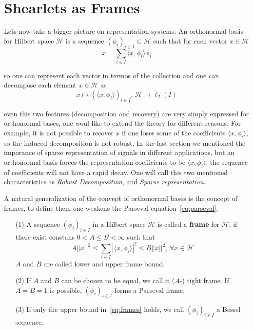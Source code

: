 \section{Shearlets as Frames}
\label{sec:ShearletsFrames}

Lets now take a bigger picture on representation systems. An orthonormal basis for Hilbert space $\mathcal{H}$ is a sequence $(\phi_i)_{i\in I}\subset\mathcal{H}$ such that for each vector $x\in\mathcal{H}$
\begin{equation}
\label{eq:parseval}
x=\sum_{i\in I}\langle x,\phi_i\rangle \phi_i
\end{equation}

so one can represent each vector in termos of the collection and one can decompose each element $x\in\mathcal{H}$ as
$$
x\mapsto (\langle x,\phi_i\rangle)_{i\in I}\text{,  }\mathcal{H}\longrightarrow \ell_2(I)
$$

even this two features (decomposition and recovery) are very simply expressed for orthonormal bases, one woul like to extend the theory for different reasons. For example, it is not possible to recover $x$ if one loses some of the coefficients $\langle x, \phi_i\rangle$, so the induced decomposition is not robust. In the last section we mentioned the imporance of sparse representation of signals in different applications, but an orthonormal basis forces the representation coefficients to be $\langle x,\phi_i\rangle$, the sequence of coefficients will not have a rapid decay. One will call this two mentioned characteristics as \textit{Robust Decomposition}, and \textit{Sparse representation}. 

\bigskip

A natural generalization of the convept of orthonormal bases is the concept of frames, to define them one weakens the Parseval equation~\ref{eq:parseval}.

\bigskip

\begin{defn}[Frames]
\label{def:frames}
\begin{enumerate}
\item[(1)] A sequence $(\phi_i)_{i\in I}$ in a Hilbert space $\mathcal{H}$ is called a \textbf{frame} for $\mathcal{H}$, if there exist constans $0<A\leq B<\infty$ such that
\begin{equation}
\label{eq:frames}
A||x||^2\leq \sum_{i\in I}|\langle x,\phi_i\rangle|^2\leq B||x||^2 \text{,  }\forall x\in \mathcal{H}
\end{equation}
$A$ and $B$ are called lower and upper frame bound.
\item[(2)] If $A$ and $B$ can be chosen to be equal, we call it ($A$-) tight frame. If $A=B=1$ is possible, $(\phi_i)_{i\in I}$ forms a Parseval frame.
\item[(3)] If only the upper bound in~\ref{eq:frames} holds, we call $(\phi_i)_{i\in I}$ a Bessel sequence.
\end{enumerate}
\end{defn}

